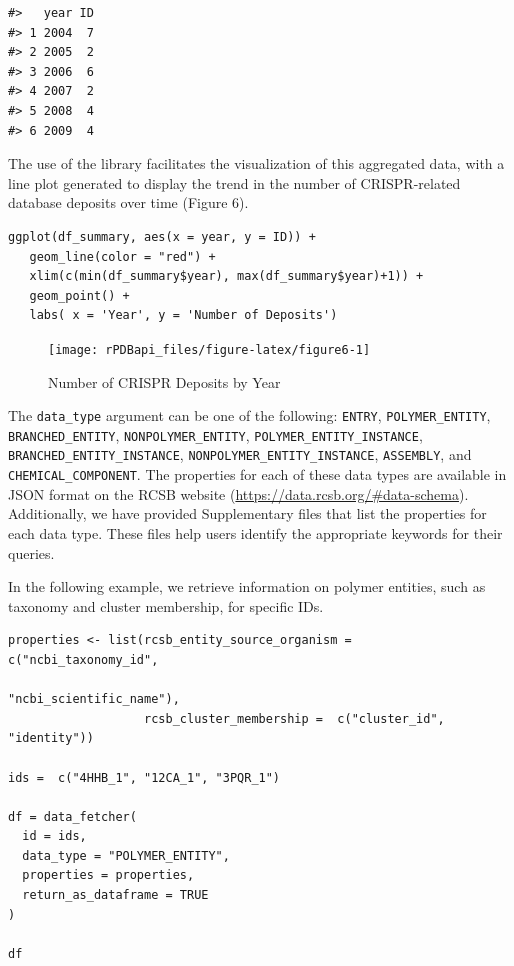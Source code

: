 \begin{verbatim}
#>   year ID
#> 1 2004  7
#> 2 2005  2
#> 3 2006  6
#> 4 2007  2
#> 5 2008  4
#> 6 2009  4
\end{verbatim}

The use of the  library facilitates the visualization of this aggregated data, with a line plot generated to display the trend in the number of CRISPR-related database deposits over time (Figure 6).

\begin{verbatim}
ggplot(df_summary, aes(x = year, y = ID)) +
   geom_line(color = "red") +
   xlim(c(min(df_summary$year), max(df_summary$year)+1)) +
   geom_point() +
   labs( x = 'Year', y = 'Number of Deposits')
\end{verbatim}

\begin{figure}[H]
\texttt{[image: rPDBapi\_files/figure-latex/figure6-1]} \caption{Number of CRISPR Deposits by Year}\label{fig:figure6}
\end{figure}

The \texttt{data\_type} argument can be one of the following: \texttt{ENTRY}, \texttt{POLYMER\_ENTITY}, \texttt{BRANCHED\_ENTITY}, \texttt{NONPOLYMER\_ENTITY}, \texttt{POLYMER\_ENTITY\_INSTANCE}, \texttt{BRANCHED\_ENTITY\_INSTANCE}, \texttt{NONPOLYMER\_ENTITY\_INSTANCE}, \texttt{ASSEMBLY}, and \texttt{CHEMICAL\_COMPONENT}. The properties for each of these data types are available in JSON format on the RCSB website (\url{https://data.rcsb.org/\#data-schema}). Additionally, we have provided Supplementary files that list the properties for each data type. These files help users identify the appropriate keywords for their queries.

In the following example, we retrieve information on polymer entities, such as taxonomy and cluster membership, for specific IDs.

\begin{verbatim}
properties <- list(rcsb_entity_source_organism =  c("ncbi_taxonomy_id", 
                                                    "ncbi_scientific_name"),
                   rcsb_cluster_membership =  c("cluster_id", "identity"))

ids =  c("4HHB_1", "12CA_1", "3PQR_1")

df = data_fetcher(
  id = ids,
  data_type = "POLYMER_ENTITY",
  properties = properties,
  return_as_dataframe = TRUE
)

df
\end{verbatim}

